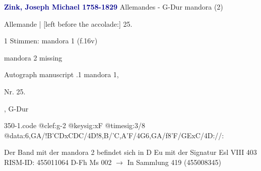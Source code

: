 \documentclass[twocolumn]{book}
\begin{document}
\newline \par \vspace{7pt} \textcolor{darkblue}{\textbf{Zink, Joseph Michael  1758-1829}}
\newline Allemandes - G-Dur
\newline mandora (2)
\newline \begin{itshape}[f.16v, at left:] Allemande | [left before the accolade:] 25.\end{itshape} 
\newline \textcolor{darkblue}{}  1 Stimmen: mandora 1  (f.16v)
\newline \begin{small} mandora 2 missing\end{small} 
\newline Autograph manuscript
.1  mandora 1, \begin{itshape}Nr. 25.\end{itshape}, G-Dur  
\begin{filecontents*}{350-1.code}
@clef:g-2
@keysig:xF
@timesig:3/8
@data:{6,GA}/!{B'CD}{xCDC}/4D!8,B/'C,A'F/4G{6,GA}/f8'F/GExC/4D://:
\end{filecontents*}
\newline
%
\newline Der Band mit der mandora 2 befindet sich in D Eu mit der Signatur Esl VIII 403
\newline RISM-ID: 455011064
\newline D-Fh  Ms 002
\newline $\rightarrow$ In Sammlung 419 (455008345)
      
\end{document}
